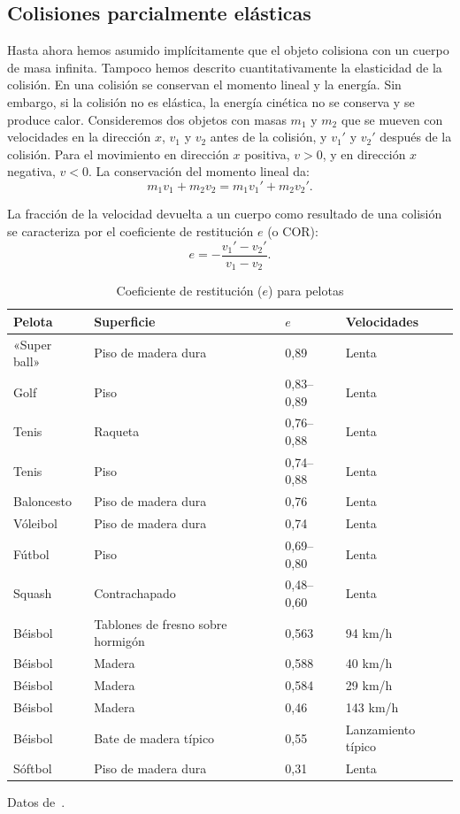 \documentclass[12pt]{book}
\begin{document}
\subsection*{Colisiones parcialmente elásticas}

Hasta ahora hemos asumido implícitamente que el objeto colisiona con un cuerpo de masa infinita. Tampoco hemos descrito cuantitativamente la elasticidad de la colisión. En una colisión se conservan el momento lineal y la energía. Sin embargo, si la colisión no es elástica, la energía cinética no se conserva y se produce calor. Consideremos dos objetos con masas $m_1$ y $m_2$ que se mueven con velocidades en la dirección $x$, $v_1$ y $v_2$ antes de la colisión, y $v_1'$ y $v_2'$ después de la colisión. Para el movimiento en dirección $x$ positiva, $v > 0$, y en dirección $x$ negativa, $v < 0$. La conservación del momento lineal da:
\begin{equation}
m_1 v_1 + m_2 v_2 = m_1 v_1' + m_2 v_2'.
\label{eq:3.108}
\end{equation}

La fracción de la velocidad devuelta a un cuerpo como resultado de una colisión se caracteriza por el coeficiente de restitución $e$ (o COR):
\begin{equation}
e = -\frac{v_1' - v_2'}{v_1 - v_2}.
\label{eq:3.109}
\end{equation}

\begin{table}[htbp]
\centering
\caption{Coeficiente de restitución ($e$) para pelotas}
\label{tab:310}
\begin{tabularx}{\textwidth}{lXlX}
\toprule
\textbf{Pelota} & \textbf{Superficie} & \textbf{$e$} & \textbf{Velocidades} \\
\midrule
«Super ball» & Piso de madera dura & 0,89 & Lenta \\
Golf & Piso & 0,83--0,89 & Lenta \\
Tenis & Raqueta & 0,76--0,88 & Lenta \\
Tenis & Piso & 0,74--0,88 & Lenta \\
Baloncesto & Piso de madera dura & 0,76 & Lenta \\
Vóleibol & Piso de madera dura & 0,74 & Lenta \\
Fútbol & Piso & 0,69--0,80 & Lenta \\
Squash & Contrachapado & 0,48--0,60 & Lenta \\
\midrule
Béisbol & Tablones de fresno sobre hormigón & 0,563 & 94 km/h \\
Béisbol & Madera & 0,588 & 40 km/h \\
Béisbol & Madera & 0,584 & 29 km/h \\
Béisbol & Madera & 0,46 & 143 km/h \\
Béisbol & Bate de madera típico & 0,55 & Lanzamiento típico \\
Sóftbol & Piso de madera dura & 0,31 & Lenta \\
\bottomrule
\end{tabularx}
\begin{flushleft}
\small
Datos de~\cite{ref1,ref66,ref83,ref134,ref137}.
\end{flushleft}
\end{table}
\end{document}

